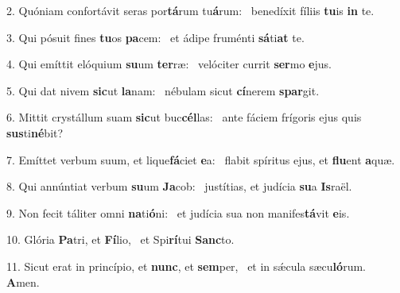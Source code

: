 2. Quóniam confortávit seras por\textbf{tá}rum tu\textbf{á}rum: \ast\  benedíxit fíliis \textbf{tu}is \textbf{in} te.\

3. Qui pósuit fines \textbf{tu}os \textbf{pa}cem: \ast\  et ádipe fruménti \textbf{sá}ti\textbf{at} te.\

4. Qui emíttit elóquium \textbf{su}um \textbf{ter}ræ: \ast\  velóciter currit \textbf{ser}mo \textbf{e}jus.\

5. Qui dat nivem \textbf{sic}ut \textbf{la}nam: \ast\  nébulam sicut \textbf{cí}nerem \textbf{spar}git.\

6. Mittit crystállum suam \textbf{sic}ut buc\textbf{cél}las: \ast\  ante fáciem frígoris ejus quis \textbf{sus}ti\textbf{né}bit?\

7. Emíttet verbum suum, et lique\textbf{fá}ciet \textbf{e}a: \ast\  flabit spíritus ejus, et \textbf{flu}ent \textbf{a}quæ.\

8. Qui annúntiat verbum \textbf{su}um \textbf{Ja}cob: \ast\  justítias, et judícia \textbf{su}a \textbf{Is}raël.\

9. Non fecit táliter omni \textbf{na}ti\textbf{ó}ni: \ast\  et judícia sua non manifes\textbf{tá}vit \textbf{e}is.\

10. Glória \textbf{Pa}tri, et \textbf{Fí}lio, \ast\  et Spi\textbf{rí}tui \textbf{Sanc}to.\

11. Sicut erat in princípio, et \textbf{nunc}, et \textbf{sem}per, \ast\  et in sǽcula sæcu\textbf{ló}rum. \textbf{A}men.\

